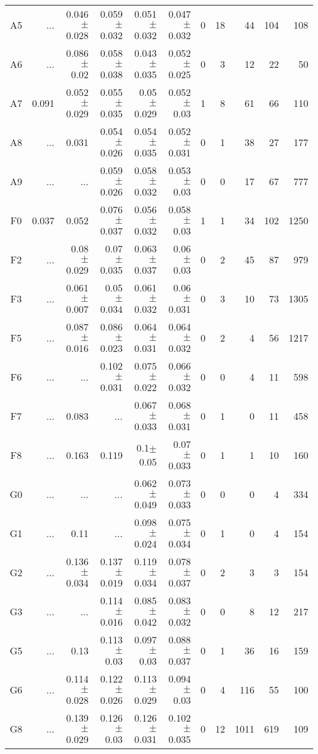 \begin{table}[t]
\begin{center}
\begin{tabular}{c|rrrrr|rrrrr}
A5	&	 ...	&	0.046$\pm$0.028	&	0.059$\pm$0.032	&	0.051$\pm$0.032	&	0.047$\pm$0.032	&	0	&	18	&	44	&	104	&	108	\\
A6	&	 ...	&	0.086$\pm$0.02	&	0.058$\pm$0.038	&	0.043$\pm$0.035	&	0.052$\pm$0.025	&	0	&	3	&	12	&	22	&	50	\\
A7	&	0.091	&	0.052$\pm$0.029	&	0.055$\pm$0.035	&	0.05$\pm$0.029	&	0.052$\pm$0.03	&	1	&	8	&	61	&	66	&	110	\\
A8	&	 ...	&	0.031	&	0.054$\pm$0.026	&	0.054$\pm$0.035	&	0.052$\pm$0.031	&	0	&	1	&	38	&	27	&	177	\\
A9	&	 ...	&	 ...	&	0.059$\pm$0.026	&	0.058$\pm$0.032	&	0.053$\pm$0.03	&	0	&	0	&	17	&	67	&	777	\\
F0	&	0.037	&	0.052	&	0.076$\pm$0.037	&	0.056$\pm$0.032	&	0.058$\pm$0.03	&	1	&	1	&	34	&	102	&	1250	\\
F2	&	 ...	&	0.08$\pm$0.029	&	0.07$\pm$0.035	&	0.063$\pm$0.037	&	0.06$\pm$0.03	&	0	&	2	&	45	&	87	&	979	\\
F3	&	 ...	&	0.061$\pm$0.007	&	0.05$\pm$0.034	&	0.061$\pm$0.032	&	0.06$\pm$0.031	&	0	&	3	&	10	&	73	&	1305	\\
F5	&	 ...	&	0.087$\pm$0.016	&	0.086$\pm$0.023	&	0.064$\pm$0.031	&	0.064$\pm$0.032	&	0	&	2	&	4	&	56	&	1217	\\
F6	&	 ...	&	 ...	&	0.102$\pm$0.031	&	0.075$\pm$0.022	&	0.066$\pm$0.032	&	0	&	0	&	4	&	11	&	598	\\
F7	&	 ...	&	0.083	&	 ...	&	0.067$\pm$0.033	&	0.068$\pm$0.031	&	0	&	1	&	0	&	11	&	458	\\
F8	&	 ...	&	0.163	&	0.119	&	0.1$\pm$0.05	&	0.07$\pm$0.033	&	0	&	1	&	1	&	10	&	160	\\
G0	&	 ...	&	 ...	&	 ...	&	0.062$\pm$0.049	&	0.073$\pm$0.033	&	0	&	0	&	0	&	4	&	334	\\
G1	&	 ...	&	0.11	&	 ...	&	0.098$\pm$0.024	&	0.075$\pm$0.034	&	0	&	1	&	0	&	4	&	154	\\
G2	&	 ...	&	0.136$\pm$0.034	&	0.137$\pm$0.019	&	0.119$\pm$0.034	&	0.078$\pm$0.037	&	0	&	2	&	3	&	3	&	154	\\
G3	&	 ...	&	 ...	&	0.114$\pm$0.016	&	0.085$\pm$0.042	&	0.083$\pm$0.032	&	0	&	0	&	8	&	12	&	217	\\
G5	&	 ...	&	0.13	&	0.113$\pm$0.03	&	0.097$\pm$0.03	&	0.088$\pm$0.037	&	0	&	1	&	36	&	16	&	159	\\
G6	&	 ...	&	0.114$\pm$0.028	&	0.122$\pm$0.026	&	0.113$\pm$0.029	&	0.094$\pm$0.03	&	0	&	4	&	116	&	55	&	100	\\
G8	&	 ...	&	0.139$\pm$0.029	&	0.126$\pm$0.03	&	0.126$\pm$0.031	&	0.102$\pm$0.035	&	0	&	12	&	1011	&	619	&	109	\\

\end{tabular}
\end{center}
\end{table}
